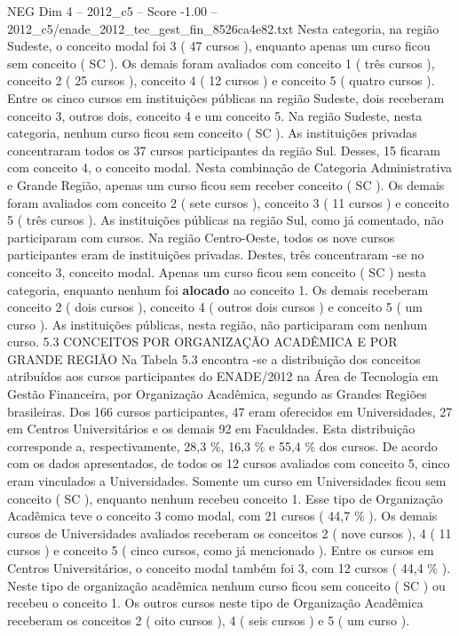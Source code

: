 \begin{textsample}{NEG Dim 4 – 2012\_c5 – Score -1.00 – 2012\_c5/enade\_2012\_tec\_gest\_fin\_8526ca4e82.txt}
Nesta categoria, na região Sudeste, o conceito modal foi 3 ( 47 cursos ), enquanto apenas um curso ficou sem conceito ( SC ).
Os demais foram avaliados com conceito 1 ( três cursos ), conceito 2 ( 25 cursos ), conceito 4 ( 12 cursos ) e conceito 5 ( quatro cursos ).
Entre os cinco cursos em instituições públicas na região Sudeste, dois receberam conceito 3, outros dois, conceito 4 e um conceito 5.
Na região Sudeste, nesta categoria, nenhum curso ficou sem conceito ( SC ).
As instituições privadas concentraram todos os 37 cursos participantes da região Sul.
Desses, 15 ficaram com conceito 4, o conceito modal.
Nesta combinação de Categoria Administrativa e Grande Região, apenas um curso ficou sem receber conceito ( SC ).
Os demais foram avaliados com conceito 2 ( sete cursos ), conceito 3 ( 11 cursos ) e conceito 5 ( três cursos ).
As instituições públicas na região Sul, como já comentado, não participaram com cursos.
Na região Centro-Oeste, todos os nove cursos participantes eram de instituições privadas.
Destes, três concentraram -se no conceito 3, conceito modal.
Apenas um curso ficou sem conceito ( SC ) nesta categoria, enquanto nenhum foi \textbf{alocado} ao conceito 1.
Os demais receberam conceito 2 ( dois cursos ), conceito 4 ( outros dois cursos ) e conceito 5 ( um curso ).
As instituições públicas, nesta região, não participaram com nenhum curso. 5.3 CONCEITOS POR ORGANIZAÇÃO ACADÊMICA E POR GRANDE REGIÃO Na Tabela 5.3 encontra -se a distribuição dos conceitos atribuídos aos cursos participantes do ENADE/2012 na Área de Tecnologia em Gestão Financeira, por Organização Acadêmica, segundo as Grandes Regiões brasileiras.
Dos 166 cursos participantes, 47 eram oferecidos em Universidades, 27 em Centros Universitários e os demais 92 em Faculdades.
Esta distribuição corresponde a, respectivamente, 28,3 \%, 16,3 \% e 55,4 \% dos cursos.
De acordo com os dados apresentados, de todos os 12 cursos avaliados com conceito 5, cinco eram vinculados a Universidades.
Somente um curso em Universidades ficou sem conceito ( SC ), enquanto nenhum recebeu conceito 1.
Esse tipo de Organização Acadêmica teve o conceito 3 como modal, com 21 cursos ( 44,7 \% ).
Os demais cursos de Universidades avaliados receberam os conceitos 2 ( nove cursos ), 4 ( 11 cursos ) e conceito 5 ( cinco cursos, como já mencionado ).
Entre os cursos em Centros Universitários, o conceito modal também foi 3, com 12 cursos ( 44,4 \% ).
Neste tipo de organização acadêmica nenhum curso ficou sem conceito ( SC ) ou recebeu o conceito 1.
Os outros cursos neste tipo de Organização Acadêmica receberam os conceitos 2 ( oito cursos ), 4 ( seis cursos ) e 5 ( um curso ).

\end{textsample}
